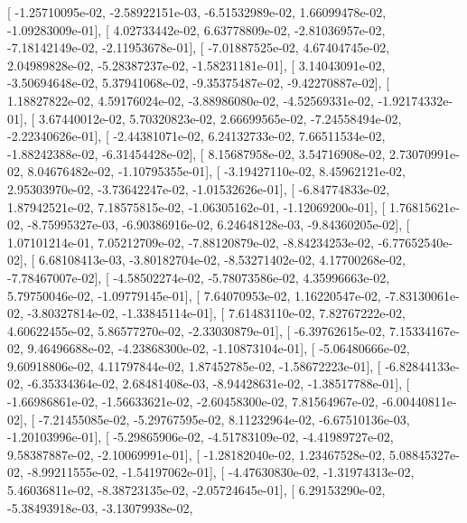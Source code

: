 \documentclass{article}
\begin{document}
       [ -1.25710095e-02,  -2.58922151e-03,  -6.51532989e-02,
          1.66099478e-02,  -1.09283009e-01],
       [  4.02733442e-02,   6.63778809e-02,  -2.81036957e-02,
         -7.18142149e-02,  -2.11953678e-01],
       [ -7.01887525e-02,   4.67404745e-02,   2.04989828e-02,
         -5.28387237e-02,  -1.58231181e-01],
       [  3.14043091e-02,  -3.50694648e-02,   5.37941068e-02,
         -9.35375487e-02,  -9.42270887e-02],
       [  1.18827822e-02,   4.59176024e-02,  -3.88986080e-02,
         -4.52569331e-02,  -1.92174332e-01],
       [  3.67440012e-02,   5.70320823e-02,   2.66699565e-02,
         -7.24558494e-02,  -2.22340626e-01],
       [ -2.44381071e-02,   6.24132733e-02,   7.66511534e-02,
         -1.88242388e-02,  -6.31454428e-02],
       [  8.15687958e-02,   3.54716908e-02,   2.73070991e-02,
          8.04676482e-02,  -1.10795355e-01],
       [ -3.19427110e-02,   8.45962121e-02,   2.95303970e-02,
         -3.73642247e-02,  -1.01532626e-01],
       [ -6.84774833e-02,   1.87942521e-02,   7.18575815e-02,
         -1.06305162e-01,  -1.12069200e-01],
       [  1.76815621e-02,  -8.75995327e-03,  -6.90386916e-02,
          6.24648128e-03,  -9.84360205e-02],
       [  1.07101214e-01,   7.05212709e-02,  -7.88120879e-02,
         -8.84234253e-02,  -6.77652540e-02],
       [  6.68108413e-03,  -3.80182704e-02,  -8.53271402e-02,
          4.17700268e-02,  -7.78467007e-02],
       [ -4.58502274e-02,  -5.78073586e-02,   4.35996663e-02,
          5.79750046e-02,  -1.09779145e-01],
       [  7.64070953e-02,   1.16220547e-02,  -7.83130061e-02,
         -3.80327814e-02,  -1.33845114e-01],
       [  7.61483110e-02,   7.82767222e-02,   4.60622455e-02,
          5.86577270e-02,  -2.33030879e-01],
       [ -6.39762615e-02,   7.15334167e-02,   9.46496688e-02,
         -4.23868300e-02,  -1.10873104e-01],
       [ -5.06480666e-02,   9.60918806e-02,   4.11797844e-02,
          1.87452785e-02,  -1.58672223e-01],
       [ -6.82844133e-02,  -6.35334364e-02,   2.68481408e-03,
         -8.94428631e-02,  -1.38517788e-01],
       [ -1.66986861e-02,  -1.56633621e-02,  -2.60458300e-02,
          7.81564967e-02,  -6.00440811e-02],
       [ -7.21455085e-02,  -5.29767595e-02,   8.11232964e-02,
         -6.67510136e-03,  -1.20103996e-01],
       [ -5.29865906e-02,  -4.51783109e-02,  -4.41989727e-02,
          9.58387887e-02,  -2.10069991e-01],
       [ -1.28182040e-02,   1.23467528e-02,   5.08845327e-02,
         -8.99211555e-02,  -1.54197062e-01],
       [ -4.47630830e-02,  -1.31974313e-02,   5.46036811e-02,
         -8.38723135e-02,  -2.05724645e-01],
       [  6.29153290e-02,  -5.38493918e-03,  -3.13079938e-02,
\end{document}
